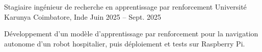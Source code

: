 \begin{cventries}
  \cventry
    {Stagiaire ingénieur de recherche en apprentissage par renforcement}
    {Université Karunya}
    {Coimbatore, Inde}
    {Juin 2025 -- Sept. 2025}
    {
      \begin{cvitems}
        \item {Développement d’un modèle d’apprentissage par renforcement pour la navigation autonome d’un robot hospitalier, puis déploiement et tests sur Raspberry Pi.}
      \end{cvitems}
    }
\end{cventries}
